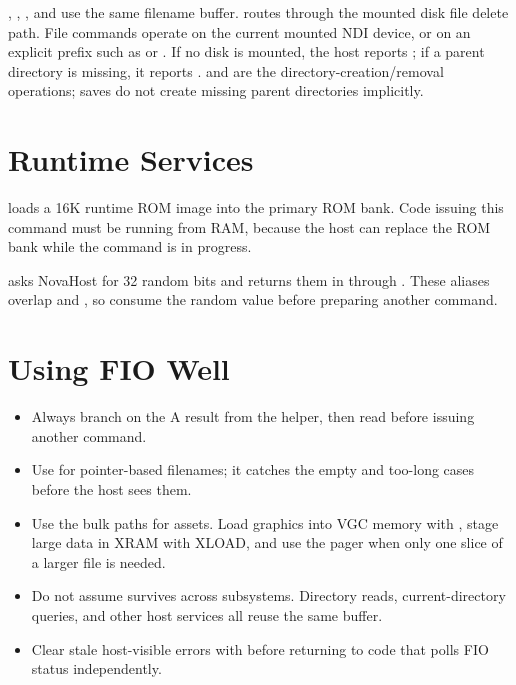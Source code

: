 , , , and
 use the same filename buffer. 
routes through the mounted disk file delete path. File commands operate on the
current mounted NDI device, or on an explicit prefix such as  or
. If no disk is mounted, the host reports
; if a parent directory is missing, it reports
.  and
 are the directory-creation/removal operations; saves do
not create missing parent directories implicitly.

\section{Runtime Services}

 loads a 16K runtime ROM image into the primary
 ROM bank. Code issuing this command must be running from RAM,
because the host can replace the ROM bank while the command is in progress.

 asks NovaHost for 32 random bits and returns them in
 through . These aliases overlap
 and , so consume the random value
before preparing another command.

\section{Using FIO Well}

\begin{itemize}
\item Always branch on the A result from the helper, then read
 before issuing another command.
\item Use  for pointer-based filenames; it catches the
empty and too-long cases before the host sees them.
\item Use the bulk paths for assets. Load graphics into VGC memory with
, stage large data in XRAM with XLOAD, and use the pager
when only one slice of a larger file is needed.
\item Do not assume  survives across subsystems. Directory
reads, current-directory queries, and other host services all reuse the same
buffer.
\item Clear stale host-visible errors with  before
returning to code that polls FIO status independently.
\end{itemize}
